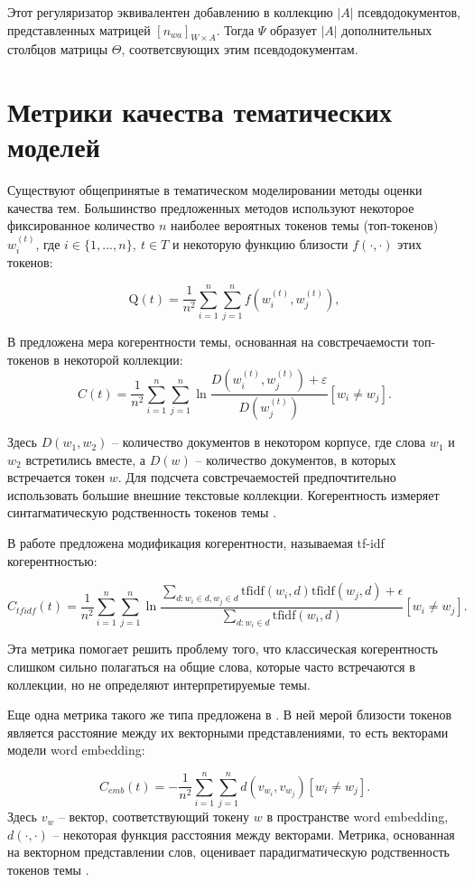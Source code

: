 Этот регуляризатор эквивалентен добавлению в коллекцию $|A|$ псевдодокументов, представленных матрицей $[n_{wa}]_{W\times A}$. Тогда $\Psi$ образует $|A|$ дополнительных столбцов матрицы $\Theta$, соответсвующих этим псевдодокументам.

\section{Метрики качества тематических моделей}
Существуют общепринятые в тематическом моделировании методы оценки качества тем. Большинство предложенных методов используют некоторое фиксированное количество $n$ наиболее вероятных токенов темы (топ-токенов) $w_i^{(t)}$, где $i \in \{1,...,n\}, \ t \in T$ и некоторую функцию близости $f(\cdot, \cdot)$ этих токенов: 

$$\mathrm{Q}(t) = \dfrac{1}{n^2}\sum\limits_{i=1}^n\sum\limits_{j=1}^n f(w_i^{(t)}, w_j^{(t)}),$$

В \cite{Mimno2011} предложена мера когерентности темы, основанная на совстречаемости топ-токенов в некоторой коллекции:
$$C(t) = \dfrac{1}{n^2}\sum\limits_{i=1}^n \sum\limits_{j=1}^n \ln \dfrac{D(w^{(t)}_i, w^{(t)}_j) + \varepsilon}{D(w^{(t)}_j)}[w_i \neq w_j].$$ 

Здесь $D(w_1, w_2)$ -- количество документов в некотором корпусе, где слова $w_1$ и $w_2$ встретились вместе, а $D(w)$ -- количество документов, в которых встречается токен $w$. Для подсчета совстречаемостей предпочтительно использовать большие внешние текстовые коллекции. Когерентность измеряет синтагматическую родственность токенов темы \cite{Schutze1993}.

В работе \cite{Nikolenko2017} предложена модификация когерентности, называемая tf-idf когерентностью:

 $$C_{tfidf}(t) = \dfrac{1}{n^2}\sum\limits_{i=1}^n \sum\limits_{j=1}^n \ln{\frac{\sum\limits_{d: w_i \in d, w_j \in d} \mathrm{tfidf}(w_i, d)\mathrm{tfidf}(w_j, d) + \epsilon}{\sum\limits_{d: w_i \in d}\mathrm{tfidf}(w_i, d)}}[w_i \neq w_j].$$


Эта метрика помогает решить проблему того, что классическая когерентность
слишком сильно полагаться на общие слова, которые часто встречаются в коллекции,
но не определяют интерпретируемые темы.

Еще одна метрика такого же типа предложена в \cite{Nikolenko2016}. В ней мерой близости токенов является расстояние между их векторными представлениями, то есть векторами модели word embedding:

$$C_{emb}(t) = -\dfrac{1}{n^2}\sum\limits_{i=1}^n \sum\limits_{j=1}^n d( v_{w_i}, v_{w_j})[w_i \neq w_j].$$
Здесь $v_{w}$ -- вектор, соответствующий токену $w$ в пространстве word embedding, $d(\cdot, \cdot)$ -- некоторая функция расстояния между векторами. Метрика, основанная на векторном представлении слов, оценивает парадигматическую родственность токенов темы \cite{Schutze1993}.

